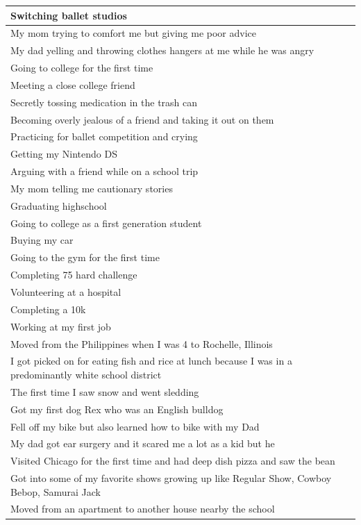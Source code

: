 \documentclass[
  .7em,
  letterpaper,
  DIV=11,
  numbers=noendperiod]{scrartcl}
\begin{document}
\begin{table}
\begin{tabular}{l}
\hline
Switching ballet studios\\
\hline
My mom trying to comfort me but giving me poor advice\\
\hline
My dad yelling and throwing clothes hangers at me while he was angry\\
\hline
Going to college for the first time\\
\hline
Meeting a close college friend\\
\hline
Secretly tossing medication in the trash can\\
\hline
Becoming overly jealous of a friend and taking it out on them\\
\hline
Practicing for ballet competition and crying\\
\hline
Getting my Nintendo DS\\
\hline
Arguing with a friend while on a school trip\\
\hline
My mom telling me cautionary stories\\
\hline
Graduating highschool\\
\hline
Going to college as a first generation student\\
\hline
Buying my car\\
\hline
Going to the gym for the first time\\
\hline
Completing 75 hard challenge\\
\hline
Volunteering at a hospital\\
\hline
Completing a 10k\\
\hline
Working at my first job\\
\hline
Moved from the Philippines when I was 4 to Rochelle, Illinois\\
\hline
I got picked on for eating fish and rice at lunch because I was in a predominantly white school district\\
\hline
The first time I saw snow and went sledding\\
\hline
Got my first dog Rex who was an English bulldog\\
\hline
Fell off my bike but also learned how to bike with my Dad\\
\hline
My dad got ear surgery and it scared me a lot as a kid but he\\
\hline
Visited Chicago for the first time and had deep dish pizza and saw the bean\\
\hline
Got into some of my favorite shows growing up like Regular Show, Cowboy Bebop, Samurai Jack\\
\hline
Moved from an apartment to another house nearby the school\\

\end{tabular}
\end{table}
\end{document}
